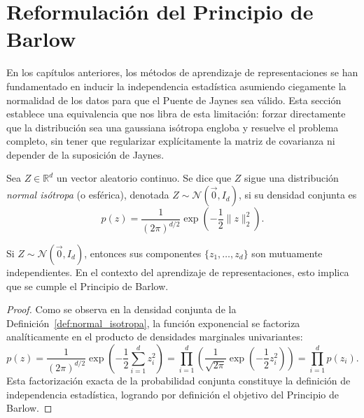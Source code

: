 \section{Reformulación del Principio de Barlow}
\label{sec:normalidad_barlow}

En los capítulos anteriores, los métodos de aprendizaje de representaciones se han fundamentado en inducir la independencia estadística asumiendo ciegamente la normalidad de los datos para que el Puente de Jaynes sea válido. Esta sección establece una equivalencia que nos libra de esta limitación: forzar directamente que la distribución sea una gaussiana isótropa engloba y resuelve el problema completo, sin tener que regularizar explícitamente la matriz de covarianza ni depender de la suposición de Jaynes.

\begin{definition}
\label{def:normal_isotropa}
Sea $Z \in \mathbb{R}^d$ un vector aleatorio continuo. Se dice que $Z$ sigue una distribución \emph{normal isótropa} (o esférica), denotada $Z \sim \mathcal{N}(\vec{0}, I_d)$, si su densidad conjunta es
\begin{equation}
p(z) = \frac{1}{(2\pi)^{d/2}} \exp\left(-\frac{1}{2}\|z\|_2^2\right).
\end{equation}
\end{definition}

\begin{proposition}
\label{prop:normal_barlow}
Si $Z \sim \mathcal{N}(\vec{0}, I_d)$, entonces sus componentes $\{z_1, \dots, z_d\}$ son mutuamente independientes. En el contexto del aprendizaje de representaciones, esto implica que se cumple el Principio de Barlow.
\end{proposition}

\begin{proof}
Como se observa en la densidad conjunta de la Definición~\ref{def:normal_isotropa}, la función exponencial se factoriza analíticamente en el producto de densidades marginales univariantes:
\begin{equation*}
p(z) = \frac{1}{(2\pi)^{d/2}} \exp\left(-\frac{1}{2}\sum_{i=1}^d z_i^2\right) = \prod_{i=1}^d \left( \frac{1}{\sqrt{2\pi}} \exp\left(-\frac{1}{2} z_i^2\right) \right) = \prod_{i=1}^d p(z_i).
\end{equation*}
Esta factorización exacta de la probabilidad conjunta constituye la definición de independencia estadística, logrando por definición el objetivo del Principio de Barlow.
\end{proof}


